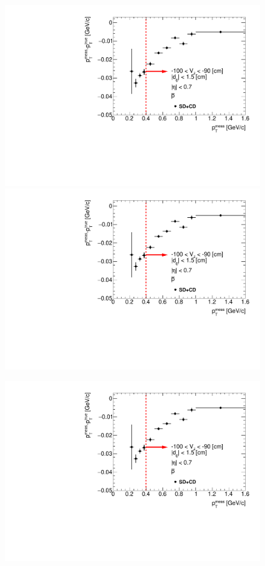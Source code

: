 \begin{figure}[H]
{  \includegraphics[width=\linewidth,page=13]{graphics/energyLoss/energyLoss3DGlobal_OnePrtAlso.pdf}\\
  \includegraphics[width=\linewidth,page=16]{graphics/energyLoss/energyLoss3DGlobal_OnePrtAlso.pdf}\\
}%
\parbox{0.329\textwidth}{
  \includegraphics[width=\linewidth,page=5]{graphics/energyLoss/energyLoss3DGlobal_OnePrtAlso.pdf}\\
}
\end{figure}
